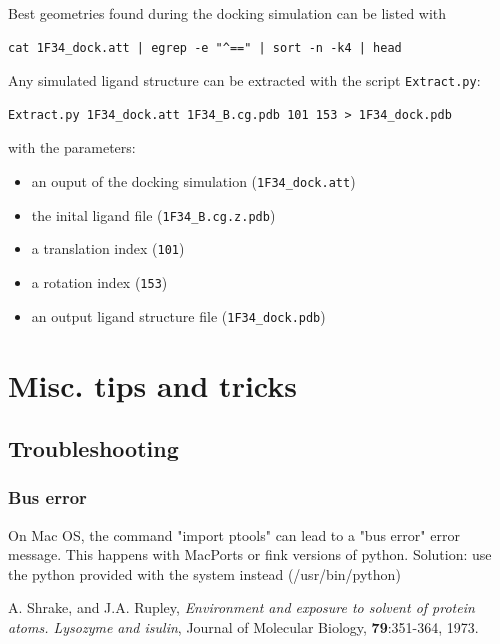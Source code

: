 \documentclass[12pt,a4paper]{article}
\begin{document}
Best geometries found during the docking simulation can be listed with
\begin{verbatim}
cat 1F34_dock.att | egrep -e "^==" | sort -n -k4 | head
\end{verbatim}

Any simulated ligand structure can be extracted with the script {\tt Extract.py}:

\begin{verbatim}
Extract.py 1F34_dock.att 1F34_B.cg.pdb 101 153 > 1F34_dock.pdb
\end{verbatim}

with the parameters:
\begin{itemize}
\item an ouput of the docking simulation ({\tt 1F34\_dock.att})
\item the inital ligand file ({\tt 1F34\_B.cg.z.pdb})
\item a translation index ({\tt 101})
\item a rotation index ({\tt 153})
\item an output ligand structure file ({\tt 1F34\_dock.pdb})
\end{itemize}



\section{Misc. tips and tricks}


\subsection{Troubleshooting}

\subsubsection{Bus error}
On Mac OS, the command "import ptools" can lead to a "bus error" error message. This happens with MacPorts or 
fink versions of python. Solution: use the python provided with the system instead (/usr/bin/python)



\begin{thebibliography}{99}

 A. Shrake, and J.A. Rupley, 
{\it Environment and exposure to solvent of protein atoms. Lysozyme and
isulin}, 
Journal of Molecular Biology, {\bf 79}:351-364, 1973.

\end{thebibliography}
\end{document}
